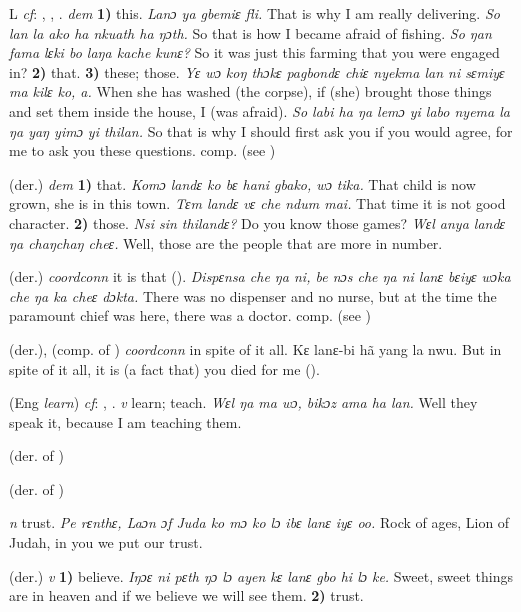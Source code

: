 \begin{letter}{L}
 \textit{cf}: , , . \textit{dem} \textbf{1)} this. \textit{Lanɔ ya gbemiɛ fli.} That is why I am really delivering. \textit{So lan la ako ha nkuath ha ŋɔth.} So that is how I became afraid of fishing. \textit{So ŋan fama lɛki bo laŋa kache kunɛ?} So it was just this farming that you were engaged in? \textbf{2)} that. \textbf{3)} these; those. \textit{Yɛ wɔ koŋ thɔkɛ pagbondɛ chiɛ nyekma lan ni sɛmiyɛ ma kilɛ ko, a.} When she has washed (the corpse), if (she) brought those things and set them inside the house, I (was afraid). \textit{So labi ha ŋa lemɔ yi labo nyema la ŋa yaŋ yimɔ yi thilan.} So that is why I should first ask you if you would agree, for me to ask you these questions. comp.  (see ) 

 (der.) \textit{dem} \textbf{1)} that. \textit{Komɔ landɛ ko bɛ hani gbako, wɔ tika.} That child is now grown, she is in this town. \textit{Tɛm landɛ vɛ che ndum mai.} That time it is not good character. \textbf{2)} those. \textit{Nsi sin thilandɛ?} Do you know those games? \textit{Wɛl anya landɛ ŋa chaŋchaŋ cheɛ.} Well, those are the people that are more in number.

 (der.) \textit{coordconn} it is that (\citealt{Sumner1921}). \textit{Dispɛnsa che ŋa ni, be nɔs che ŋa ni lanɛ bɛiyɛ wɔka che ŋa ka cheɛ dɔkta.} There was no dispenser and no nurse, but at the time the paramount chief was here, there was a doctor. comp.  (see )

 (der.), (comp. of ) \textit{coordconn} in spite of it all. Kɛ lanɛ-bi hã yang la nwu. But in spite of it all, it is (a fact that) you died for me (\citealt{Pichl1967}). 

 (Eng \textit{learn}) \textit{cf}: , . \textit{v} learn; teach. \textit{Wɛl ŋa ma wɔ, bikɔz ama ha lan.} Well they speak it, because I am teaching them.

 (der. of ) 

 (der. of ) 

 \textit{n} trust. \textit{Pe rɛnthɛ, Laɔn ɔf Juda ko mɔ ko lɔ ibɛ lanɛ iyɛ oo.} Rock of ages, Lion of Judah, in you we put our trust.

 (der.) \textit{v} \textbf{1)} believe. \textit{Iŋɔɛ ni pɛth ŋɔ lɔ ayen kɛ lanɛ gbo hi lɔ ke.} Sweet, sweet things are in heaven and if we believe we will see them. \textbf{2)} trust.


\end{letter}
